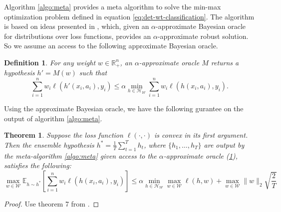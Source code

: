\documentclass{article}
\newtheorem{definition}{Definition}
\newtheorem{theorem}{Theorem}
\newcommand{\E}{\mathbb{E}}
\newcommand{\set}[1]{\{#1\}}
\newcommand{\bbR}{\mathbb{R}}
\newcommand{\WW}{\mathcal{W}}
\newcommand{\HH}{\mathcal{H}}
\newcommand{\norm}[1]{\lVert #1 \rVert}
\begin{document}
Algorithm \ref{algo:meta} provides a meta algorithm to solve the min-max optimization problem defined in equation \ref{eq:det-wt-classification}. The algorithm is based on ideas presented in \cite{CLSS17}, which, given an $\alpha$-approximate
Bayesian oracle for distributions over loss functions, provides an $\alpha$-approximate robust solution. So we assume an access to the following approximate Bayesian oracle.
\begin{definition}\label{def:oracle}
For any weight $w \in \bbR^n_+$, an $\alpha$-approximate oracle $M$ returns a hypothesis $h' = M(w)$ such that
$$\sum_{i=1}^n w_i \ell(h'(x_i,a_i),y_i) \le \alpha \min_{h \in \HH_{\WW}} \sum_{i=1}^n w_i \ell(h(x_i,a_i),y_i).$$
\end{definition}
Using the approximate Bayesian oracle, we have the following gurantee on the output of algorithm \ref{algo:meta}. 
\begin{theorem}\label{thm:meta-algo-result}
Suppose the loss function $\ell(\cdot,\cdot)$ is convex in its first argument. Then the ensemble hypothesis $h^* = \frac{1}{T}\sum_{t=1}^T h_t$, where $\set{h_1,\ldots,h_T}$ are output by the meta-algorithm \ref{algo:meta} given access to the $\alpha$-approximate oracle (\ref{def:oracle}), satisfies the following:
$$\max_{w \in \WW} \E_{h \sim h^*}\left[ \sum_{i=1}^n w_i \ell(h(x_i,a_i),y_i)\right] \le \alpha \min_{h \in {\HH}_{\WW} } \max_{w \in \WW} \ell(h,w) + \max_{w \in \WW} \norm{w}_2 \sqrt{\frac{2}{T}}$$
\end{theorem}
\begin{proof}
Use theorem 7 from \citet{CLSS17}.
\end{proof}
\end{document}
